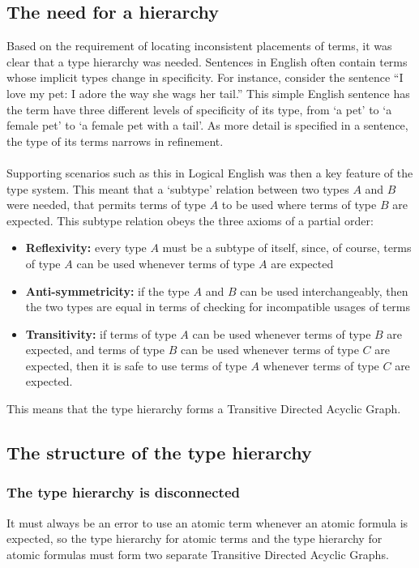 \documentclass[../main.tex]{subfiles}
\begin{document}
\subsection{The need for a hierarchy}
Based on the requirement of locating inconsistent placements of terms, it was clear that a type hierarchy was needed. Sentences in English often contain terms whose implicit types change in specificity. 
For instance, consider the sentence ``I love my pet: I adore the way she wags her tail.'' This simple English sentence has the term  have three different levels of specificity of its type, from `a pet' to `a female pet' to `a female pet with a tail'. As more detail is specified in a sentence, the type of its terms narrows in refinement. 
\\
\\
Supporting scenarios such as this in Logical English was then a key feature of the type system. This meant that a `subtype' relation between two types $A$ and $B$ were needed, that permits terms of type $A$ to be used where terms of type $B$ are expected. This subtype relation obeys the three axioms of a partial order:
\begin{itemize}
    \item \textbf{Reflexivity:} every type $A$ must be a subtype of itself, since, of course, terms of type $A$ can be used whenever terms of type $A$ are expected
    \item \textbf{Anti-symmetricity:} if the type $A$ and $B$ can be used interchangeably, then the two types are equal in terms of checking for incompatible usages of terms
    \item \textbf{Transitivity:} if terms of type $A$ can be used whenever terms of type $B$ are expected, and terms of type $B$ can be used whenever terms of type $C$ are expected, then it is safe to use terms of type $A$ whenever terms of type $C$ are expected.
\end{itemize}
This means that the type hierarchy forms a Transitive Directed Acyclic Graph. 
\subsection{The structure of the type hierarchy}
\subsubsection{The type hierarchy is disconnected}
It must always be an error to use an atomic term whenever an atomic formula is expected, so the type hierarchy for atomic terms and the type hierarchy for atomic formulas must form two separate Transitive Directed Acyclic Graphs. 
\end{document}
